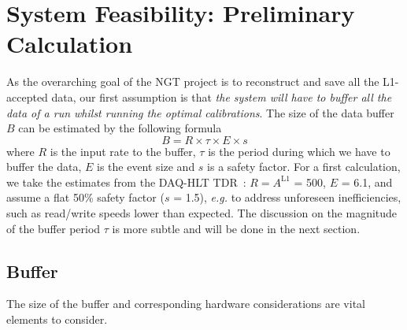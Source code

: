 \section{System Feasibility: Preliminary Calculation}
As the overarching goal of the NGT project is to reconstruct and save all the L1-accepted data, 
our first assumption is that 
\emph{the system will have to buffer all the data of a run whilst running the optimal calibrations}.
The size of the data buffer $B$ can be estimated by the following formula
\begin{equation}
B = R \times \tau \times E \times s
\label{eq:buffersize}
\end{equation}
where $R$ is the input rate to the buffer,
$\tau$ is the period during which we have to buffer the data,
$E$ is the event size and
$s$ is a safety factor.
For a first calculation, we take the \Runfour estimates from the DAQ-HLT TDR~\cite{Collaboration:2759072}:
$R = A^\text{L1}$ = 500\kHz, $E$ = 6.1\MB,
and assume a flat 50\% safety factor ($s$ = 1.5),
\textit{e.g.\@} to address unforeseen inefficiencies, such as read/write speeds lower than expected.
The discussion on the magnitude of the buffer period $\tau$ is more subtle and will be done in the next section.

\subsection{Buffer}\label{sec:DAQbuffer}
The size of the buffer and corresponding hardware considerations are vital elements to consider.

